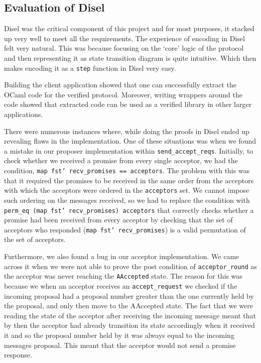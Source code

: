 \subsection{Evaluation of Disel}
Disel was the critical component of this project and for most purposes, it
stacked up very well to meet all the requirements.
The experience of encoding in Disel felt very natural. This was because
focusing on the `core' logic of the protocol and then representing it
as state transition diagram is quite intuitive. Which then makes
encoding it as a \texttt{step} function in Disel very easy.

Building the client application showed that one can successfully extract
the OCaml code for the verified protocol. Moreover, writing wrappers
around the code showed that extracted code can be used as a verified library
in other larger applications.

There were numerous instances where, while doing the proofs in Disel
ended up revealing flaws in the implementation. One of these situations was
when we found a mistake in our proposer implementation within
\texttt{send\_accept\_reqs}. Initially, to check
whether we received a promise from every single acceptor, we had the condition,
\texttt{map fst' recv\_promises == acceptors}. The problem with this was that
it required the promises to be received in the same order from the acceptors
with which the acceptors were ordered in the \texttt{acceptors} set. We cannot impose
such ordering on the messages received, so we had to replace the condition
with \texttt{perm\_eq (map fst' recv\_promises) acceptors} that correctly checks
whether a promise had been received from every acceptor by checking that
the set of acceptors who responded (\texttt{map fst' recv\_promises}) is
a valid permutation of the set of acceptors.

Furthermore, we also found a bug in our acceptor implementation. We came
across it when we were not able to prove the post condition of \texttt{acceptor\_round}
as the acceptor was never reaching the \texttt{AAccepted} state.
The reason for this was because we when an acceptor receives an \texttt{accept\_request}
we checked if the incoming proposal had a proposal number greater than the one
currently held by the proposal, and only then move to the AAccepted state. The fact
that we were reading the state of the acceptor after receiving the incoming message
meant that by then the acceptor had already transition its state accordingly
when it received it and so the proposal number held by it was always
equal to the incoming messages proposal. This meant that the acceptor would not
send a promise response.

